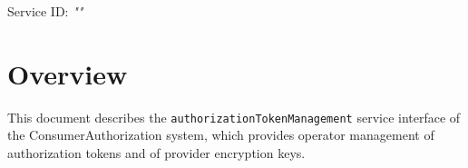 \documentclass[a4paper]{arrowhead}
\begin{document}
\sloppy

\ArrowheadSetup

\begin{center}
  \vspace*{1cm}
  \huge{\arrowtitle}

  \vspace*{0.2cm}
  \LARGE{\arrowtype}
  \vspace*{1cm}

  \Large{Service ID: \textit{"\arrowid"}}

  \vspace*{\fill}


  \vspace*{1cm}
  \vspace*{\fill}

  \begin{abstract}
    This document describes the HTTP/1.1 protocol with TLS payload security and JSON payload encoding variant of the \texttt{authorization\allowbreak{}Token\allowbreak{}Management} service of the ConsumerAuthorization system.
  \end{abstract}

  \vspace*{1cm}
\end{center}

\newpage

\tableofcontents
\newpage

\section{Overview}
\label{sec:overview}

This document describes the \texttt{authorization\allowbreak{}Token\allowbreak{}Management} service interface of the ConsumerAuthorization system, which provides operator management of authorization tokens and of provider encryption keys.
\end{document}
